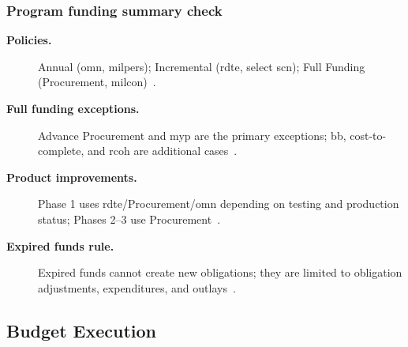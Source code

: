 \documentclass[../main.tex]{subfiles}
\begin{document}
\subsubsection{Program funding summary check}
\begin{description}
  \item[\textbf{Policies.}] Annual (\ac{omn}, \ac{milpers}); Incremental (\ac{rdte}, select \ac{scn}); Full Funding (Procurement, \ac{milcon})~\autocite{edo-3-1-3-program-funding-2025,DoDFMR-Vol2A-Ch1}.
  \item[\textbf{Full funding exceptions.}] Advance Procurement and \ac{myp} are the primary exceptions; \ac{bb}, cost-to-complete, and \ac{rcoh} are additional cases~\autocite{edo-3-1-3-program-funding-2025,DoDFMR-Vol2A-Ch1}.
  \item[\textbf{Product improvements.}] Phase 1 uses \ac{rdte}/Procurement/\ac{omn} depending on testing and production status; Phases 2--3 use Procurement~\autocite{edo-3-1-3-program-funding-2025,DoDFMR-Vol2A-Ch1}.
  \item[\textbf{Expired funds rule.}] Expired funds cannot create new obligations; they are limited to obligation adjustments, expenditures, and outlays~\autocite{edo-3-1-3-program-funding-2025}.
\end{description}

\subsection{Budget Execution}
\end{document}
